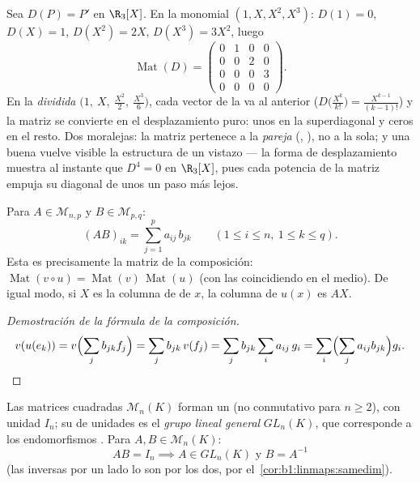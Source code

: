 \begin{example}
\label{ex:b1:matrices:derivative}
Sea $D(P) = P'$ en $\R_3[X]$. En la  monomial
$(1, X, X^2, X^3)$: $D(1) = 0$, $D(X) = 1$, $D(X^2) = 2X$,
$D(X^3) = 3X^2$, luego
\[
\operatorname{Mat}(D) =
\begin{pmatrix}
0 & 1 & 0 & 0\\
0 & 0 & 2 & 0\\
0 & 0 & 0 & 3\\
0 & 0 & 0 & 0
\end{pmatrix}.
\]
En la  \emph{dividida}
$\bigl(1,\ X,\ \frac{X^2}2,\ \frac{X^3}6\bigr)$, cada vector de la
 va al anterior
($D\bigl(\frac{X^k}{k!}\bigr) = \frac{X^{k-1}}{(k-1)!}$) y la matriz
se convierte en el desplazamiento puro: unos en la superdiagonal y
ceros en el resto. Dos moralejas: la matriz pertenece a la
\emph{pareja} (, ), no a la  sola; y una
buena  vuelve visible la estructura de un vistazo --- la forma
de desplazamiento muestra al instante que $D^4 = 0$ en $\R_3[X]$,
pues cada potencia de la matriz empuja su diagonal de unos un paso
más lejos.
\end{example}

\begin{definition}[Producto]\label{def:b1:matrices:product}
Para $A \in \mathcal{M}_{n,p}$ y $B \in \mathcal{M}_{p,q}$:
\[
(AB)_{ik} = \sum_{j=1}^{p} a_{ij}\, b_{jk}
\qquad (1 \leq i \leq n,\ 1 \leq k \leq q).
\]
Esta es precisamente la matriz de la composición:
$\operatorname{Mat}(v \circ u) = \operatorname{Mat}(v)\,
\operatorname{Mat}(u)$ (con las  coincidiendo en el medio). De
igual modo, si $X$ es la columna de  de $x$, la columna
de $u(x)$ es $AX$.
\end{definition}

\begin{proof}[Demostración de la fórmula de la composición]
\[
v(u(e_k)) = v\Bigl(\sum_j b_{jk} f_j\Bigr) = \sum_j b_{jk}\, v(f_j)
= \sum_j b_{jk} \sum_i a_{ij}\, g_i
= \sum_i \Bigl(\sum_j a_{ij} b_{jk}\Bigr) g_i . \qedhere
\]
\end{proof}

\begin{proposition}\label{prop:b1:matrices:ring}
Las matrices cuadradas $\mathcal{M}_n(K)$ forman un  (no
conmutativo para $n \geq 2$), con unidad $I_n$; su  de unidades
es el \emph{grupo lineal general}
$GL_n(K)$, que corresponde a los endomorfismos . Para
$A, B \in \mathcal{M}_n(K)$:
\[
AB = I_n \implies A \in GL_n(K) \text{ y } B = A^{-1}
\]
(las inversas por un lado lo son por los dos, por
el~\cref{cor:b1:linmaps:samedim}).
\end{proposition}

